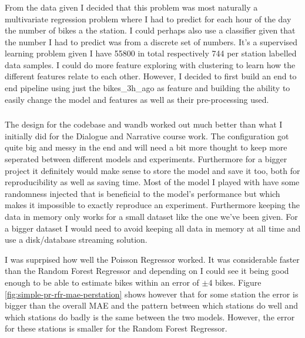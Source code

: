 \documentclass[a4paper]{article}
\begin{document}
    \subsubsection*{}
    From the data given I decided that this problem was most naturally a multivariate regression problem where I had to
    predict for each hour of the day the number of bikes a the station. I could perhaps also use a classifier given that
    the number I had to predict was from a discrete set of numbers. It's a supervised learning problem given I have 55800
    in total respectively 744 per station labelled data samples. I could do more feature exploring with clustering to
    learn how the different features relate to each other. However, I decided to first build an end to end pipeline using
    just the bikes\_3h\_ago as feature and building the ability to easily change the model and features as well as their
    pre-processing used.

    \subsubsection*{}
    The design for the codebase and wandb worked out much better than what I initially did for the Dialogue and Narrative
    course work. The configuration got quite big and messy in the end and will need a bit more thought to
    keep more seperated between different models and experiments. Furthermore for a bigger project it definitely would
    make sense to store the model and save it too, both for
    reproducibility as well as saving time. Most of the model I played with have some randomness injected that is
    beneficial to the model's performance but which makes it impossible to exactly reproduce an experiment. Furthermore
    keeping the data in memory only works for a small dataset like the one we've been given. For a bigger dataset I
    would need to avoid keeping all data in memory at all time and use a disk/database streaming solution.

    I was suprpised how well the Poisson Regressor worked. It was considerable faster than the Random Forest Regressor
    and depending on I could see it being good enough to be able to estimate bikes within an error of $\pm$4 bikes.
    Figure \ref{fig:simple-pr-rfr-mae-perstation} shows however that for some station the error is bigger
    than the overall MAE and the pattern between which stations do well and which stations do badly is the same between the
    two models. However, the error for these stations is smaller for the Random Forest Regressor.
\end{document}
